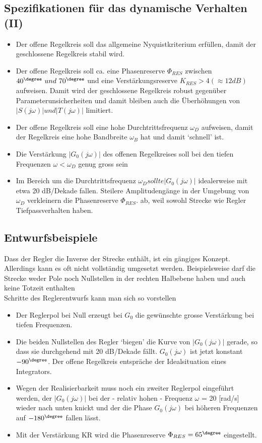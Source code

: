 \subsection{Spezifikationen für das dynamische Verhalten (II)}
\begin{itemize}
\item Der offene Regelkreis soll das allgemeine Nyquistkriterium
erfüllen, damit der geschlossene Regelkreis stabil wird.
\item Der offene Regelkreis soll ca. eine Phasenreserve $\Phi_{RES}$ zwischen $40^{\degree} \ und \ 70^{\degree}$
und eine Verstärkungsreserve $K_{RES} > 4 (\approx 12dB)$ aufweisen. Damit wird der
geschlossene Regelkreis robust gegenüber Parameterunsicherheiten und damit
bleiben auch die Überhöhungen von $|S(j\omega)| und |T(j\omega)|$ limitiert.
\item Der offene Regelkreis soll eine hohe Durchtrittsfrequenz $\omega_D$ aufweisen, damit
der Regelkreis eine hohe Bandbreite $\omega_B$ hat und damit ‘schnell’ ist.
\item Die Verstärkung $|G_0(j\omega)|$ des offenen Regelkreises soll bei den tiefen Frequenzen
$\omega < \omega_D$ genug gross sein
\item Im Bereich um die Durchtrittsfrequenz $\omega_D sollte |G_0(j\omega)|$ idealerweise mit
etwa 20 dB/Dekade fallen. Steilere Amplitudengänge in der Umgebung von
$\omega_D$ verkleinern die Phasenreserve $\Phi_{RES}$.
ab, weil sowohl Strecke wie Regler Tiefpassverhalten haben.
\end{itemize}
\subsection{Entwurfsbeispiele}
Dass der Regler die Inverse der Strecke enthält, ist ein gängiges Konzept. Allerdings
kann es oft nicht vollständig umgesetzt werden. Beispielsweise darf die Strecke weder
Pole noch Nullstellen in der rechten Halbebene haben und auch keine Totzeit enthalten\\
Schritte des Reglerentwurfs kann man sich so vorstellen
\begin{itemize}
\item  Der Reglerpol bei Null erzeugt bei $G_0$ die gewünschte grosse Verstärkung bei
tiefen Frequenzen.
\item  Die beiden Nullstellen des Regler ‘biegen’ die Kurve von $|G_0(j\omega)|$ gerade, so
dass sie durchgehend mit 20 dB/Dekade fällt. $G_0(j\omega)$ ist jetzt konstant $-90^{\degree}$.
Der offene Regelkreis entspräche der Idealsituation eines Integrators.
\item  Wegen der Realisierbarkeit muss noch ein zweiter Reglerpol eingeführt werden,
der $|G_0(j\omega)|$ bei der - relativ hohen - Frequenz $\omega$ = 20 [rad/s] wieder nach
unten knickt und der die Phase $G_0(j\omega)$ bei höheren Frequenzen auf $-180^{\degree}$
fallen lässt.
\item  Mit der Verstärkung KR wird die Phasenreserve $\Phi_{RES} = 65^{\degree}$ eingestellt.
\end{itemize}


